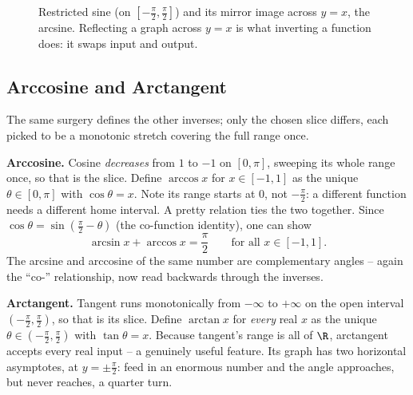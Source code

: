 \begin{figure}[H]
\centering
{}
\caption{Restricted sine (on $[-\tfrac\pi2,\tfrac\pi2]$) and its mirror image across $y=x$, the arcsine. Reflecting a graph across $y=x$ is what inverting a function does: it swaps input and output.}
\label{ch04:fig-arcsin}
\end{figure}

\subsection{Arccosine and Arctangent}

The same surgery defines the other inverses; only the chosen slice differs, each picked to be a monotonic stretch covering the full range once.

\textbf{Arccosine.} Cosine \emph{decreases} from $1$ to $-1$ on $[0,\pi]$, sweeping its whole range once, so that is the slice. Define $\arccos x$ for $x\in[-1,1]$ as the unique $\theta\in[0,\pi]$ with $\cos\theta = x$. Note its range starts at $0$, not $-\tfrac\pi2$: a different function needs a different home interval. A pretty relation ties the two together. Since $\cos\theta = \sin(\tfrac\pi2 - \theta)$ (the co-function identity), one can show
\[
  \arcsin x + \arccos x = \frac{\pi}{2}\qquad\text{for all }x\in[-1,1].
\]
The arcsine and arccosine of the same number are complementary angles -- again the ``co-'' relationship, now read backwards through the inverses.

\textbf{Arctangent.} Tangent runs monotonically from $-\infty$ to $+\infty$ on the open interval $(-\tfrac\pi2, \tfrac\pi2)$, so that is its slice. Define $\arctan x$ for \emph{every} real $x$ as the unique $\theta\in(-\tfrac\pi2,\tfrac\pi2)$ with $\tan\theta = x$. Because tangent's range is all of $\R$, arctangent accepts every real input -- a genuinely useful feature. Its graph has two horizontal asymptotes, at $y = \pm\tfrac\pi2$: feed in an enormous number and the angle approaches, but never reaches, a quarter turn.

